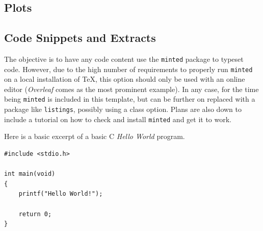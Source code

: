 \documentclass[palatino,english]{ist-report}
\newcommand*{\package}[1]{\texttt{#1}}
\begin{document}
\subsection{Plots}

\subsection{Code Snippets and Extracts}

The objective is to have any code content use the \package{minted} package to typeset code. However, due to the high number of requirements to properly run \package{minted} on a local installation of \TeX{}, this option should only be used with an online editor (\textit{Overleaf} comes as the most prominent example). In any case, for the time being \package{minted} is included in this template, but can be further on replaced with a package like \package{listings}, possibly using a class option. Plans are also down to include a tutorial on how to check and install \package{minted} and get it to work.

Here is a basic excerpt of a basic C \textit{Hello World} program.
\begin{verbatim}
#include <stdio.h>

int main(void)
{
    printf("Hello World!");
    
    return 0;
}
\end{verbatim}



\pagebreak

\printbibliography
\end{document}
